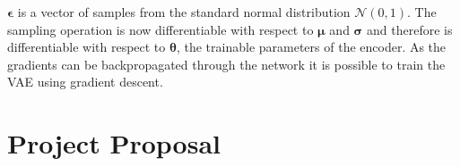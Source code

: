 \documentclass[12pt,a4paper,twoside,openright]{report}
\renewcommand{\vec}[1]{\bm{#1}}
\begin{document}
$\vec{\epsilon}$ is a vector of samples from the standard normal distribution $\mathcal{N}(0, 1)$. The sampling operation is now differentiable
with respect to $\vec{\mu}$ and $\vec{\sigma}$ and therefore is differentiable with respect to $\vec{\theta}$, the trainable parameters of the encoder. As the
gradients can be backpropagated through the network it is possible to train the VAE using gradient descent.

\chapter{Project Proposal} \label{proposal}

\end{document}
